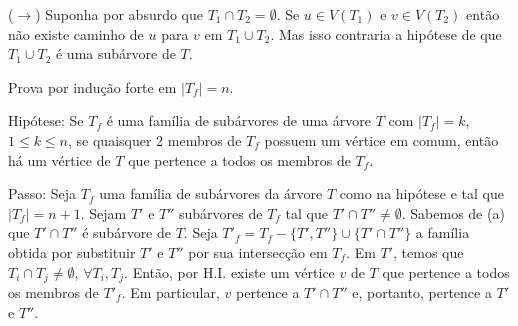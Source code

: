 
($\rightarrow$) Suponha por absurdo que $T_1 \cap T_2 = \emptyset$. Se
$u \in V(T_1)$ e $v \in V(T_2)$ então não existe caminho de $u$ para $v$ em
$T_1 \cup T_2$. Mas isso contraria a hipótese de que $T_1 \cup T_2$ é uma
subárvore de $T$.

Prova por indução forte em $|T_f| = n$.

Hipótese: Se $T_f$ é uma família de subárvores de uma árvore $T$ com $|T_f| = k$,
$ 1 \le k \le n$, se quaisquer 2 membros de $T_f$ possuem um vértice em comum,
então há um vértice de $T$ que pertence a todos os membros de $T_f$.

Passo: Seja $T_f$ uma família de subárvores da árvore $T$ como na hipótese e tal
que $|T_f| = n + 1$. Sejam $T'$ e $T''$ subárvores de $T_f$ tal que
$T' \cap T'' \ne \emptyset$. Sabemos de (a) que $T' \cap T''$ é subárvore de $T$.
Seja $T'_f = T_f - \{T', T''\} \cup \{T' \cap T''\}$ a família obtida por
substituir $T'$ e $T''$ por sua intersecção em $T_f$. Em $T'$, temos que
$T_i \cap T_j \ne \emptyset$, $\forall T_i, T_j$. Então, por H.I. existe um
vértice $v$ de $T$ que pertence a todos os membros de $T'_f$. Em particular, $v$
pertence a $T' \cap T''$ e, portanto, pertence a $T'$ e $T''$.
\fimprova
